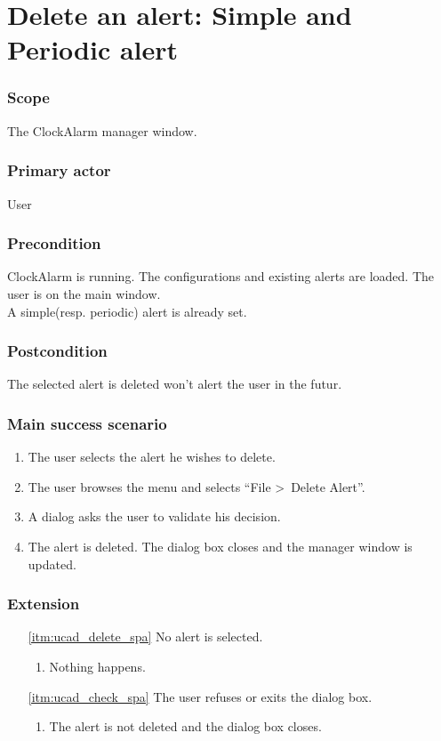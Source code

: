 \section{Delete an alert: Simple and Periodic alert}\label{subsec:usecase_delete_simple_alert}

\subsubsection{Scope}
The ClockAlarm manager window.
\subsubsection{Primary actor}
User
\subsubsection{Precondition}
ClockAlarm is running. The configurations and existing alerts are loaded. The user is on the main window.
\\A simple(resp. periodic) alert is already set.
\subsubsection{Postcondition}
The selected alert is deleted won't alert the user in the futur.
\subsubsection{Main success scenario}
\begin{enumerate}
	\item The user selects the alert he wishes to delete.
	\item \label{itm:ucad_delete_spa} The user browses the menu and selects ``File \textgreater~Delete Alert''.
	\item \label{itm:ucad_check_spa} A dialog asks the user to validate his decision.
	\item The alert is deleted. The dialog box closes and the manager window is updated.
\end{enumerate}
\subsubsection{Extension}
\begin{enumerate}
	\item[\ref{itm:ucad_delete_spa}] No alert is selected.
	\begin{enumerate}[i]
		\item Nothing happens.
	\end{enumerate}
	
	\item[\ref{itm:ucad_check_spa}] The user refuses or exits the dialog box.
	\begin{enumerate}[i]
		\item The alert is not deleted and the dialog box closes.
	\end{enumerate}
\end{enumerate}

